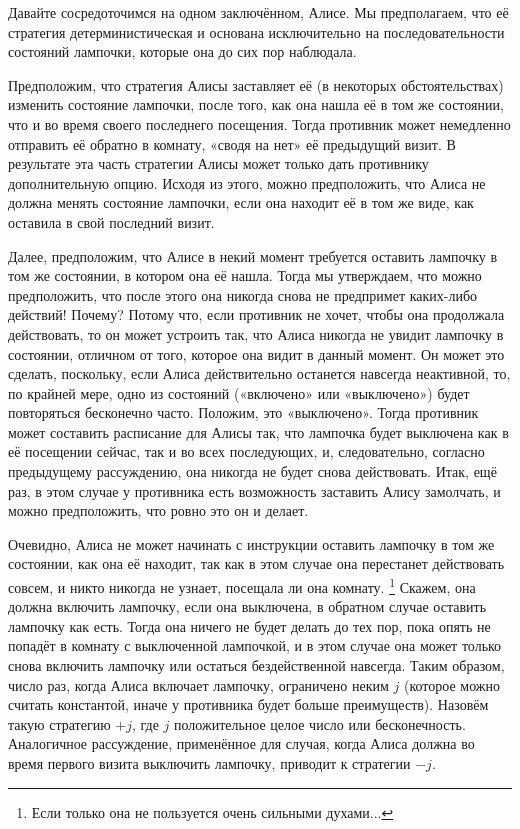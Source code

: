 Давайте сосредоточимся на одном заключённом, Алисе.
Мы предполагаем, что её стратегия детерминистическая и основана исключительно на последовательности состояний лампочки, которые она до сих пор наблюдала.

Предположим, что стратегия Алисы заставляет её (в некоторых обстоятельствах) изменить состояние лампочки, после того, как она нашла её в том же состоянии, что и во время своего последнего посещения.
Тогда противник может немедленно отправить её обратно в комнату, «сводя на нет» её предыдущий визит.
В результате эта часть стратегии Алисы может только дать противнику дополнительную опцию.
Исходя из этого, можно предположить, что Алиса не должна менять состояние лампочки, если она находит её в том же виде, как оставила в свой последний визит.

Далее, предположим, что Алисе в некий момент требуется оставить лампочку в том же состоянии, в котором она её нашла.
Тогда мы утверждаем, что можно предположить, что после этого она никогда снова не предпримет каких-либо действий!
Почему?
Потому что, если противник не хочет, чтобы она продолжала действовать, то он может устроить так, что Алиса никогда не увидит лампочку в состоянии, отличном от того, которое она видит в данный момент.
Он может это сделать, поскольку, если Алиса действительно останется навсегда неактивной, то, по крайней мере, одно из состояний («включено» или «выключено») будет повторяться бесконечно часто.
Положим, это «выключено».
Тогда противник может составить расписание для Алисы так, что лампочка будет выключена как в её посещении сейчас, так и во всех последующих, и, следовательно, согласно предыдущему рассуждению, она никогда не будет снова действовать.
Итак, ещё раз, в этом случае у противника есть возможность заставить Алису замолчать, и можно предположить, что ровно это он и делает.

Очевидно, Алиса не может начинать с инструкции оставить лампочку в том же состоянии, как она её находит, так как в этом случае она перестанет действовать совсем, и никто никогда не узнает, посещала ли она комнату.%
\footnote{Если только она не пользуется очень сильными духами...}
Скажем, она должна включить лампочку, если она выключена, в обратном случае оставить лампочку как есть.
Тогда она ничего не будет делать до тех пор, пока опять не попадёт в комнату с выключенной лампочкой, и в этом случае она может только снова включить лампочку или остаться бездейственной навсегда.
Таким образом, число раз, когда Алиса включает лампочку, ограничено неким $j$ (которое можно считать константой, иначе у противника будет больше преимуществ).
Назовём такую стратегию $+j$, где $j$ положительное целое число или бесконечность.
Аналогичное рассуждение, применённое для случая, когда Алиса должна во время первого визита выключить лампочку, приводит к стратегии $-j$.

